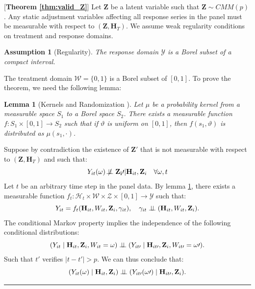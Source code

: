 \documentclass[10pt]{article} %
\newcommand{\BlackBox}{\rule{1.5ex}{1.5ex}}  %
\renewenvironment{proof}{\par\noindent{\bf Proof\ }}{\hfill\BlackBox\\[2mm]}
\newenvironment{proof}{\par\noindent{\bf Proof\ }}{\hfill\BlackBox\\[2mm]}
\newtheorem{lemma}[theorem]{Lemma}
\newtheorem{assumption}[theorem]{Assumption}
\begin{document}
\begin{proof}[\textbf{Theorem \ref{thm:valid_Z}}]
\label{assp:regularity_y_space}
Let \(\mathbf{Z}\) be a latent variable such that \(\mathbf{Z} \sim CMM(p)\). Any static adjustment variables affecting all response series in the panel must be measurable with respect to \((\mathbf{Z}, \mathbf{H}_T)\). We assume weak regularity conditions on treatment and response domains.
\begin{assumption}[Regularity]
The response domain \(\mathcal{Y}\) is a Borel subset of a compact interval.
\end{assumption}
The treatment domain \(\mathcal{W} = \{0,1\}\) is a Borel subset of \([0,1]\). To prove the theorem, we need the following lemma:
\begin{lemma}[Kernels and Randomization \citep{Kallenberg2021FoundationsOM}]
\label{lem: kernel_RD}
Let \(\mu\) be a probability kernel from a measurable space \(S_1\) to a Borel space \(S_2\). There exists a measurable function \(f: S_1 \times [0,1] \rightarrow S_2\) such that if \(\vartheta\) is uniform on \([0,1]\), then \(f(s_1, \vartheta)\) is distributed as \(\mu(s_1, \cdot)\).
\end{lemma}
Suppose by contradiction the existence of $\mathbf{Z}\prime$ that is not measurable with respect to $(\mathbf{Z}, \mathbf{H}_T)$ and such that: 
\begin{equation*}
    Y_{it}(\omega) \not\!\perp\!\!\!\perp \mathbf{Z_i}\prime| \mathbf{H}_{it}, \mathbf{Z}_i \quad \forall \omega, t
\end{equation*}
Let $t$ be an arbitrary time step in the panel data. By lemma \ref{lem: kernel_RD}, there exists a measurable function  $f_t: \mathcal{H}_t \times \mathcal{W} \times \mathcal{Z} \times [0,1] \rightarrow \mathcal{Y}$ such that: 
\begin{equation*}
    Y_{it} = f_t(\mathbf{H}_{it}, W_{it}, \mathbf{Z}_i, \gamma_{it}), \quad \gamma_{it} \perp \!\!\! \perp (\mathbf{H}_{it}, W_{it}, \mathbf{Z}_i).
\end{equation*}
The conditional Markov property implies the independence of the following conditional distributions: 
\begin{equation*}
    (Y_{it}\mid \mathbf{H}_{it}, \mathbf{Z}_i, W_{it} = \omega) \perp \!\!\! \perp  (Y_{it\prime}\mid \mathbf{H}_{it\prime}, \mathbf{Z}_i, W_{it\prime} = \omega\prime).
\end{equation*}
Such that  $t\prime$ verifies $|t - t\prime| > p$. We can thus conclude that: 
\begin{equation*}
    (Y_{it}(\omega) \mid \mathbf{H}_{it}, \mathbf{Z}_i) \indep  (Y_{it\prime}(\omega\prime) \mid \mathbf{H}_{it\prime}, \mathbf{Z}_i).

\end{equation*}
\end{proof}
\end{document}
